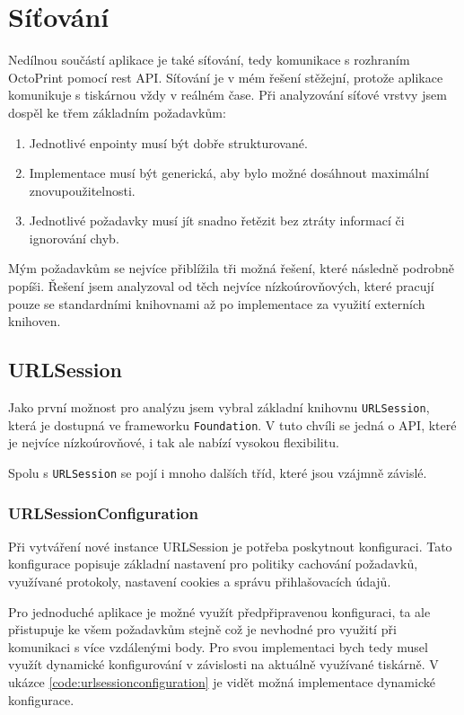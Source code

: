 \section{Síťování}\label{analyza-sitovani}

Nedílnou součástí aplikace je také síťování, tedy komunikace s rozhraním OctoPrint pomocí \acrshort{rest} API.
Síťování je v mém řešení stěžejní, protože aplikace komunikuje s tiskárnou vždy v reálném čase.
Při analyzování síťové vrstvy jsem dospěl ke třem základním požadavkům:

\begin{enumerate}
    \item Jednotlivé enpointy musí být dobře strukturované.
    \item Implementace musí být generická, aby bylo možné dosáhnout maximální znovupoužitelnosti.
    \item Jednotlivé požadavky musí jít snadno řetězit bez ztráty informací či ignorování chyb.
\end{enumerate}

Mým požadavkům se nejvíce přiblížila tři možná řešení, které následně podrobně popíši.
Řešení jsem analyzoval od těch nejvíce nízkoúrovňových, které pracují pouze se standardními knihovnami až po implementace za využití externích knihoven.

\subsection{URLSession}

Jako první možnost pro analýzu jsem vybral základní knihovnu \texttt{URLSession}, která je dostupná ve frameworku \texttt{Foundation}.
V tuto chvíli se jedná o API, které je nejvíce nízkoúrovňové, i tak ale nabízí vysokou flexibilitu.

Spolu s \texttt{URLSession} se pojí i mnoho dalších tříd, které jsou vzájmně závislé.

\subsubsection*{URLSessionConfiguration}

Při vytváření nové instance URLSession je potřeba poskytnout konfiguraci.
Tato konfigurace popisuje základní nastavení pro politiky cachování požadavků, využívané protokoly, nastavení cookies a správu přihlašovacích údajů.

Pro jednoduché aplikace je možné využít předpřipravenou konfiguraci, ta ale přistupuje ke všem požadavkům stejně což je nevhodné pro využití při komunikaci s více vzdálenými body.
Pro svou implementaci bych tedy musel využít dynamické konfigurování v závislosti na aktuálně využívané tiskárně.
V ukázce \ref{code:urlsessionconfiguration} je vidět možná implementace dynamické konfigurace.

